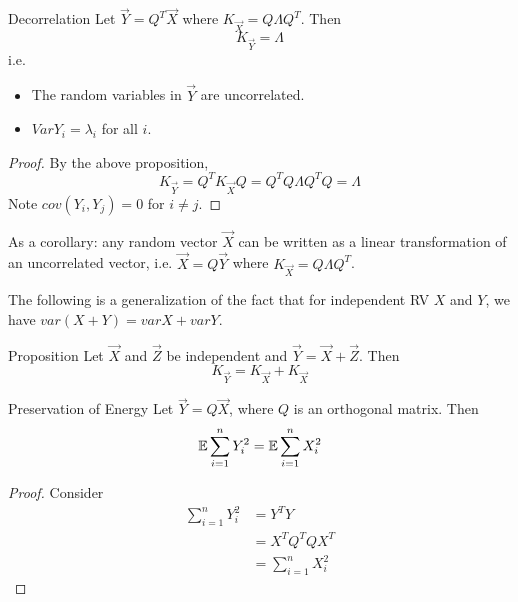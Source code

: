 \documentclass[../main.tex]{subfiles}
\begin{document}
\begin{bbox}{Decorrelation}
    Let $\vec Y = Q^T \vec X$ where $K_{\vec X}=Q\Lambda Q^T$. Then \[
    K_{\vec Y} = \Lambda
    \] i.e. \begin{itemize}
        \item The random variables in $\vec Y$ are uncorrelated. 
        \item $Var Y_i=\lambda_i$ for all $i$.
    \end{itemize}
    \begin{proof}
        By the above proposition, \[
        K_{\vec Y} = Q^T K_{\vec X} Q = Q^T Q\Lambda Q^T Q=\Lambda
        \]
        Note $cov(Y_i,Y_j)=0$ for $i\neq j$.
    \end{proof}
    \begin{remark}
        As a corollary: any random vector $\vec X$ can be written as a linear transformation of an uncorrelated vector, i.e. $\vec X = Q\vec Y$ where $K_{\vec X}=Q\Lambda Q^T$.
    \end{remark}
\end{bbox}
The following is a generalization of the fact that for independent RV $X$ and $Y$, we have $var(X+Y)=var X + var Y$.
\begin{bbox}{Proposition}
    Let $\vec X$ and $\vec Z$ be independent and $\vec Y = \vec X + \vec Z$. Then \[
    K_{\vec Y} = K_{\vec X} + K_{\vec X}
    \]
\end{bbox}
\begin{bbox}{Preservation of Energy}
    Let $\vec Y = Q\vec X$, where $Q$ is an orthogonal matrix. Then \[
    \mathbb{E} \sum_{i=1}^n Y_i^2 = \mathbb{E} \sum_{i=1}^n X_i^2
    \]
    \begin{proof}
        Consider \begin{align*}
            \sum_{i=1}^n Y_i^2 &= Y^T Y\\
            &= X^T Q^T Q X^T\\
            &= \sum_{i=1}^n X_i^2
        \end{align*}
    \end{proof}
\end{bbox}
\end{document}
